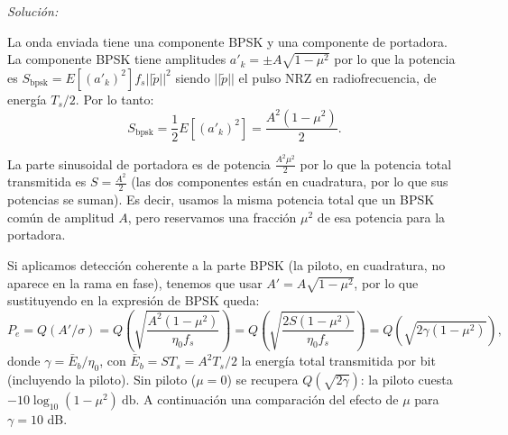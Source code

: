 \documentclass[a4paper,11pt]{article}
\newenvironment{solucion}[1][]{
\noindent \large \textsl{Solución:} \ifthenelse{\equal{#1}{}}{}{\emph{(#1)}}

\smallskip
}{
\bigskip
}
\begin{document}
\begin{solucion}
La onda enviada tiene una componente BPSK y una componente de portadora. La componente BPSK tiene amplitudes $a'_k = \pm A\sqrt{1-\mu^2}$ por lo que la potencia es $S_{\mathrm{bpsk}} = E[(a'_k)^2] f_s ||\tilde{p}||^2$ siendo $||\tilde{p}||$ el pulso NRZ en radiofrecuencia, de energía $T_s/2$. Por lo tanto: 
\begin{equation*}
        S_{\mathrm{bpsk}}=\frac{1}{2}E[(a'_k)^2] = \frac{A^2 (1-\mu^2)}{2}.        
\end{equation*}

La parte sinusoidal de portadora es de potencia $\frac{A^2\mu^2}{2}$ por lo que la potencia total transmitida es $S=\frac{A^2}{2}$ (las dos componentes están en cuadratura, por lo que sus potencias se suman). Es decir, usamos la misma potencia total que un BPSK común de amplitud $A$, pero reservamos una fracción $\mu^2$ de esa potencia para la portadora.

Si aplicamos detección coherente a la parte BPSK (la piloto, en cuadratura, no aparece en la rama en fase), tenemos que usar $A' = A\sqrt{1-\mu^2}$, por lo que sustituyendo en la expresión de BPSK queda:
\begin{equation*}
        P_e = Q\left(A'/\sigma\right) = Q\left(\sqrt{\frac{A^2(1-\mu^2)}{\eta_0 f_s}}\right) = Q\left(\sqrt{\frac{2S(1-\mu^2)}{\eta_0 f_s}}\right)= Q\left(\sqrt{2\gamma(1-\mu^2)}\right),
\end{equation*}
donde $\gamma = \bar{E}_b/\eta_0$, con $\bar{E}_b = ST_s=A^2T_s/2$ la energía total transmitida por bit (incluyendo la piloto). Sin piloto ($\mu=0$) se recupera $Q(\sqrt{2\gamma})$: la piloto cuesta $-10\log_{10}(1-\mu^2)\ \unit{\decibel}$. A continuación una comparación del efecto de $\mu$ para $\gamma = 10$ dB.
\begin{center}
        
\end{center}

\end{solucion}
\end{document}

